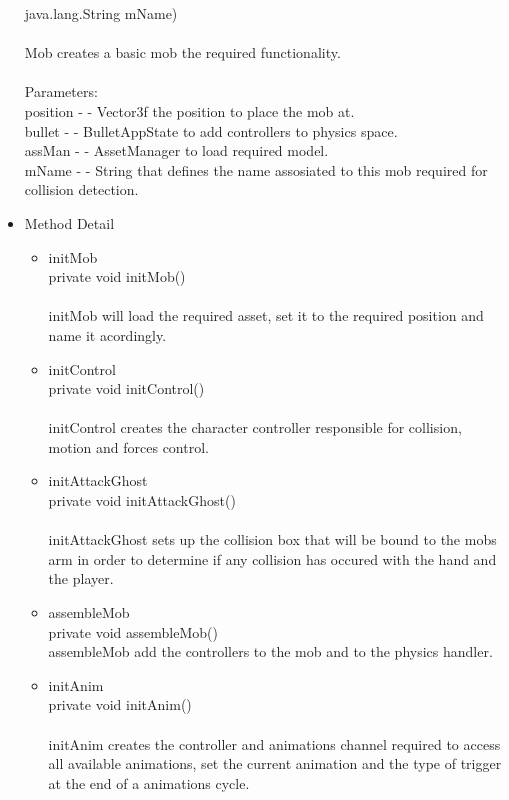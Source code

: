 \documentclass[letterpaper]{article}
\begin{document}
\begin{itemize}
		  java.lang.String mName) \\ \\ 
										Mob creates a basic mob the required functionality. \\ \\
										Parameters: \\
										position - - Vector3f the position to place the mob at. \\
										bullet - - BulletAppState to add controllers to physics space. \\
										assMan - - AssetManager to load required model. \\
										mName - - String that defines the name assosiated to this mob required for collision detection.
								\item	Method Detail
										\begin{itemize}
											\item	initMob \\
													private void initMob() \\ \\
													initMob will load the required asset, set it to the required position and name it acordingly. \\ 
											\item	initControl \\
													private void initControl() \\ \\
													initControl creates the character controller responsible for collision, motion and forces control.
											\item	initAttackGhost \\
													private void initAttackGhost() \\ \\
													initAttackGhost sets up the collision box that will be bound to the mobs arm in order to determine if any collision has occured with the hand and the player.
											\item	assembleMob \\
													private void assembleMob() \\
													assembleMob add the controllers to the mob and to the physics handler. \\
											\item	initAnim \\
													private void initAnim() \\ \\
													initAnim creates the controller and animations channel required to access all available animations, set the current animation and the type of trigger at the end of a animations cycle.

\end{itemize}
\end{itemize}
\end{document}
